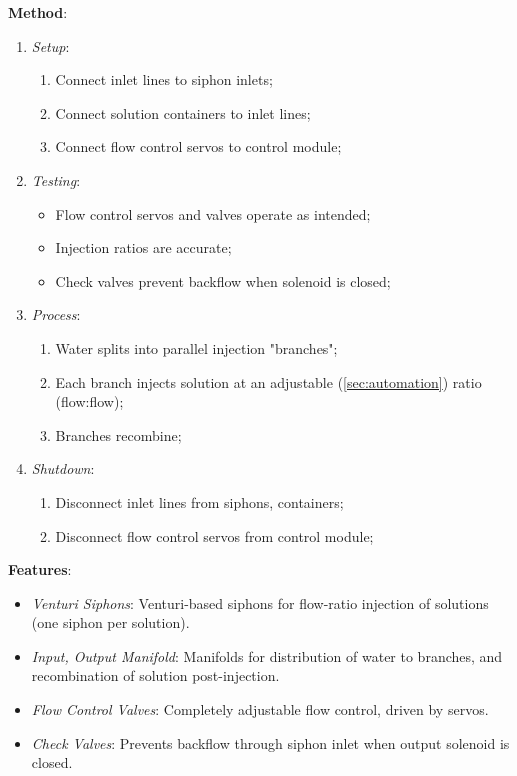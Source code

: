 \documentclass{report}
\begin{document}
\textbf{Method}:
\begin{enumerate}
    \item \textit{Setup}:
    \begin{enumerate}
        \item Connect inlet lines to siphon inlets;
        \item Connect solution containers to inlet lines;
        \item Connect flow control servos to control module;
    \end{enumerate}
    \item \textit{Testing}:
    \begin{itemize}
        \item Flow control servos and valves operate as intended;
        \item Injection ratios are accurate;
        \item Check valves prevent backflow when solenoid is closed;
    \end{itemize}
    \item \textit{Process}:
    \begin{enumerate}
        \item Water splits into parallel injection "branches";
        \item Each branch injects solution at an adjustable (\ref{sec:automation}) ratio (flow:flow);
        \item Branches recombine;
    \end{enumerate}
    \item \textit{Shutdown}:
    \begin{enumerate}
        \item Disconnect inlet lines from siphons, containers;
        \item Disconnect flow control servos from control module;
    \end{enumerate}
\end{enumerate}

\textbf{Features}:
\begin{itemize}
    \item \textit{Venturi Siphons}: Venturi-based siphons for flow-ratio injection of solutions (one siphon per solution).
    \item \textit{Input, Output Manifold}: Manifolds for distribution of water to branches, and recombination of solution post-injection.
    \item \textit{Flow Control Valves}: Completely adjustable flow control, driven by servos.
    \item \textit{Check Valves}: Prevents backflow through siphon inlet when output solenoid is closed.
\end{itemize}
\end{document}
